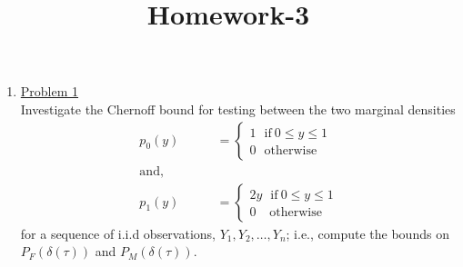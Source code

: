 \documentclass[a4paper,english,12pt]{article}
\title{Homework-3}
\author{}
\begin{document}
\maketitle 
\begin{enumerate}
\subsection*{Chernoff Bound}
\item \hyperlink{solution1}{Problem 1}\\
Investigate the Chernoff bound for testing between the two marginal densities
\begin{align*}
p_0(y)&=\begin{cases}
1~\hspace{5pt}\mbox{if}~0\leq y \leq 1\\
0~\hspace{5pt}\mbox{otherwise}
\end{cases}\\
\mbox{and},\hspace{40pt}&\\
p_1(y)&=\begin{cases}
2y~\hspace{5pt}\mbox{if}~0\leq y \leq 1\\
0~\hspace{10pt}\mbox{otherwise}
\end{cases}
\end{align*}
for a sequence of i.i.d observations, $Y_1,Y_2,\dots,Y_n$; i.e., compute the bounds on $P_F(\delta(\tau))$ and $P_M(\delta(\tau))$.

\end{enumerate}
\end{document}
